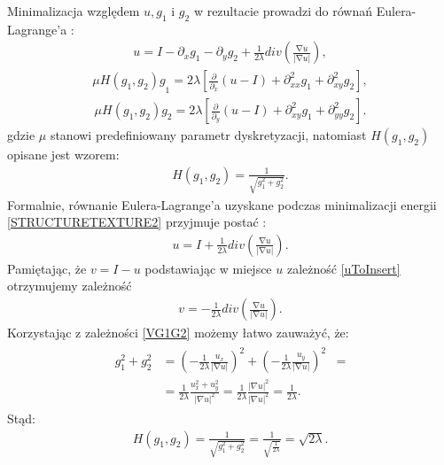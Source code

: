 \documentclass[a4paper,12pt,twoside,openany]{report}
\begin{document}
Minimalizacja względem $u, g_1$ i $g_2$ w rezultacie prowadzi do równań Eulera-Lagrange'a \cite{vese2003modeling}:
\begin{align}
u=I-{\partial }_xg_1-{\partial }_yg_2+\frac{1}{2\lambda }div\left(\frac{\mathrm{\nabla }u}{\left|\mathrm{\nabla }u\right|}\right),
\label{EL1}
\end{align}
\begin{align}
{\mu H\left(g_1,g_2\right)g}_1=2\lambda \left[\frac{\partial }{{\partial }_x}\left(u-I\right)+{\partial }^2_{xx}g_1+{\partial }^2_{xy}g_2\right],
\label{EL2}
\end{align}
\begin{align}
\mu H\left(g_1,g_2\right)g_2=2\lambda \left[\frac{\partial }{{\partial }_y}\left(u-I\right)+{\partial }^2_{xy}g_1+{\partial }^2_{yy}g_2\right].
\label{EL3}
\end{align}
gdzie $\mu$ stanowi predefiniowany parametr dyskretyzacji, natomiast $H\left(g_1,g_2\right)$ opisane jest wzorem:
\begin{align}
H\left(g_1,g_2\right)=\frac{1}{\sqrt{g^2_1+g^2_2}}.
\end{align}
Formalnie, równanie Eulera-Lagrange'a uzyskane podczas minimalizacji energii \eqref{STRUCTURETEXTURE2} przyjmuje postać \cite{vese2003modeling}:
\begin{align}
u=I+\frac{1}{2\lambda }div\left(\frac{\mathrm{\nabla }u}{\left|\mathrm{\nabla }u\right|}\right).
\label{uToInsert}
\end{align}
Pamiętając, że $v = I -u$ podstawiając w miejsce $u$ zależność \eqref{uToInsert} otrzymujemy zależność
\begin{align}
v=-\frac{1}{2\lambda }div\left(\frac{\mathrm{\nabla }u}{\left|\mathrm{\nabla }u\right|}\right).
\end{align}
Korzystając z zależności \eqref{VG1G2} możemy łatwo zauważyć, że:
\begin{align}
\begin{aligned}
g^2_1+g^2_2 & = 
\left(-\frac{1}{2\lambda }\frac{u_x}{\left|\mathrm{\nabla }u\right|}\right)^2 +  \left(-\frac{1}{2\lambda }\frac{u_y}{\left|\mathrm{\nabla }u\right|}\right)^2 &=\\
&= \frac{1}{2\lambda} \frac{u_x^2 + u_y^2 }{|\nabla u|^2} = \frac{1}{2\lambda} \frac{|\nabla u|^2}{|\nabla u|^2} = \frac{1}{2\lambda}.
\end{aligned}
\end{align}
Stąd:
\begin{align}
H\left(g_1,g_2\right)=\frac{1}{\sqrt{g^2_1+g^2_2}} = \frac{1}{\sqrt{\frac{1}{2\lambda}}} = \sqrt{2\lambda}.
\end{align}
\end{document}
